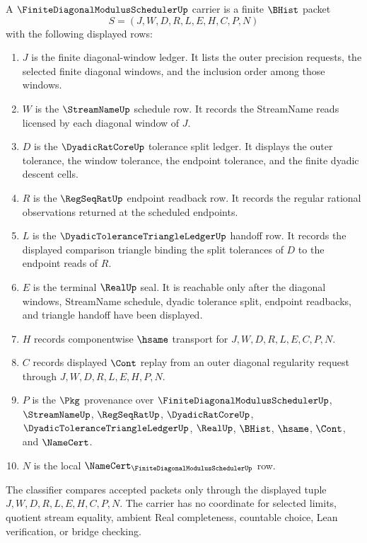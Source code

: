 \begin{definition}\label{def:finite-diagonal-modulus-scheduler-carrier}
A $\FiniteDiagonalModulusSchedulerUp$ carrier is a finite $\BHist$ packet
$$
S=(J,W,D,R,L,E,H,C,P,N)
$$
with the following displayed rows:
\begin{enumerate}
\item $J$ is the finite diagonal-window ledger. It lists the outer precision requests, the selected finite diagonal windows, and the inclusion order among those windows.
\item $W$ is the $\StreamNameUp$ schedule row. It records the StreamName reads licensed by each diagonal window of $J$.
\item $D$ is the $\DyadicRatCoreUp$ tolerance split ledger. It displays the outer tolerance, the window tolerance, the endpoint tolerance, and the finite dyadic descent cells.
\item $R$ is the $\RegSeqRatUp$ endpoint readback row. It records the regular rational observations returned at the scheduled endpoints.
\item $L$ is the $\DyadicToleranceTriangleLedgerUp$ handoff row. It records the displayed comparison triangle binding the split tolerances of $D$ to the endpoint reads of $R$.
\item $E$ is the terminal $\RealUp$ seal. It is reachable only after the diagonal windows, StreamName schedule, dyadic tolerance split, endpoint readbacks, and triangle handoff have been displayed.
\item $H$ records componentwise $\hsame$ transport for $J,W,D,R,L,E,C,P,N$.
\item $C$ records displayed $\Cont$ replay from an outer diagonal regularity request through $J,W,D,R,L,E,H,P,N$.
\item $P$ is the $\Pkg$ provenance over $\FiniteDiagonalModulusSchedulerUp$, $\StreamNameUp$, $\RegSeqRatUp$, $\DyadicRatCoreUp$, $\DyadicToleranceTriangleLedgerUp$, $\RealUp$, $\BHist$, $\hsame$, $\Cont$, and $\NameCert$.
\item $N$ is the local $\NameCert_{\FiniteDiagonalModulusSchedulerUp}$ row.
\end{enumerate}
The classifier compares accepted packets only through the displayed tuple $J,W,D,R,L,E,H,C,P,N$. The carrier has no coordinate for selected limits, quotient stream equality, ambient Real completeness, countable choice, Lean verification, or bridge checking.
\end{definition}

